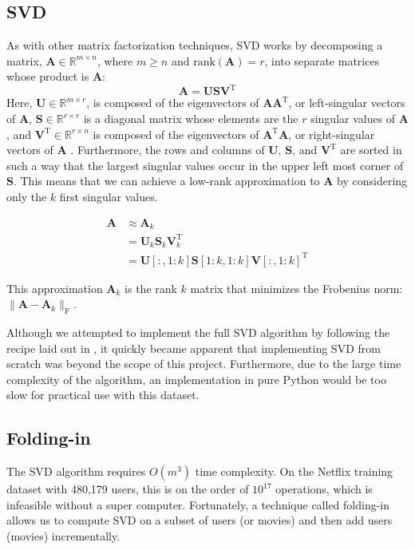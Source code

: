 \documentclass{article} %
\newcommand{\A}{\mathbf{A}}
\newcommand{\T}{\textrm{T}}
\begin{document}
\subsection{SVD}

As with other matrix factorization techniques, SVD works by decomposing a matrix, $\A \in \mathbb{R}^{m \times n}$, where $m \geq n$ and
$\textrm{rank}(\A) = r$,
into separate matrices whose product is $\A$:
$$\A = \mathbf{U}\mathbf{S}\mathbf{V}^{\T}$$
Here, $\mathbf{U} \in \mathbb{R}^{m \times r}$, is composed of the eigenvectors of $\A\A^{\T}$, or left-singular vectors of $\A$, 
$\mathbf{S} \in \mathbb{R}^{r \times r}$ is a diagonal matrix whose elements are the $r$ singular values of $\A$,
and $\mathbf{V}^{\T} \in \mathbb{R}^{r \times n}$ is composed of the
eigenvectors of $\A^{\T}\A$, or right-singular vectors of $\A$
\citep{golub1970}.
Furthermore, the rows and columns of $\mathbf{U}$, $\mathbf{S}$, and $\mathbf{V}^{\T}$ are sorted in such a way that the largest singular values occur in the upper left most corner of $\mathbf{S}$.
This means that we can achieve a low-rank approximation to $\A$ by considering only the $k$ first singular values.

\begin{align*}
	\A &\approx \A_k\\
	&= \mathbf{U}_k\mathbf{S}_k\mathbf{V}_k^{\T}\\
	&= \mathbf{U}[:,1:k]\mathbf{S}[1:k,1:k]\mathbf{V}[:,1:k]^{\T}
\end{align*}

This approximation $\A_k$ is the rank $k$ matrix that minimizes the Frobenius norm: $\|\A - \A_k\|_{\textrm{F}}$.

Although we attempted to implement the full SVD algorithm by following the recipe laid out in \cite{recipes2007}, it quickly became apparent that implementing SVD from scratch was beyond the scope of this project.
Furthermore, due to the large time complexity of the algorithm, an implementation in pure Python would be too slow for practical use with this dataset.

\subsection{Folding-in}
The SVD algorithm requires $O(m^3)$ time complexity.
On the Netflix training dataset with 480,179 users, this is on the order of $10^{17}$ operations, which is infeasible without a super computer.
Fortunately, a technique called folding-in allows us to compute SVD on a subset of users (or movies) and then add users (movies) incrementally.
\end{document}
